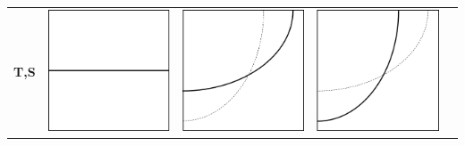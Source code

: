 \documentclass[11pt]{article}
\begin{document}
\begin{table}[!h]
\begin{center}
\begin{tabular}{|r|c|c|c|c|}
  \textbf{T,S}
     & \includegraphics[scale=0.25]{isothermets.png} 
     & \includegraphics[scale=0.25]{isochorets.png} 
     & \includegraphics[scale=0.25]{isobarets.png} 

\end{tabular}
\end{center}
\end{table}
\end{document}
